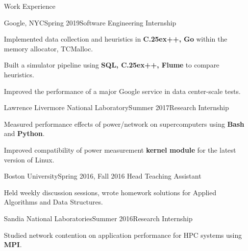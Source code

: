 \documentclass{resume}
\def\bfCplusplus{{\rm{\bf C\raise.25ex\hbox{\small ++}}}}
\begin{document}
\begin{rSection}{Work Experience}

\begin{rWorksection}{Google, NYC}{Spring 2019}{Software Engineering
    Internship}
\item Implemented data collection and heuristics in {\bf \bfCplusplus{}, Go} within the memory
  allocator, TCMalloc.
\item Built a simulator pipeline using {\bf SQL, \bfCplusplus{}, Flume} to
  compare heuristics.
\item Improved the performance of a major Google service in data center-scale tests.
\end{rWorksection}

\begin{rWorksection}{Lawrence Livermore National Laboratory}{Summer
    2017}{Research Internship}
\item Measured performance effects of power/network on supercomputers using {\bf
    Bash} and {\bf Python}.
\item Improved compatibility of power measurement {\bf kernel module} for the
  latest version of Linux.
\end{rWorksection}

\begin{rWorksection}{Boston University}{Spring 2016, Fall 2016}
    {Head Teaching Assistant}
\item Held weekly discussion sessions, wrote homework solutions for Applied
  Algorithms and Data Structures.
\end{rWorksection}

\begin{rWorksection}{Sandia National Laboratories}{Summer 2016}{Research
    Internship}
\item Studied network contention on application performance for HPC systems
  using {\bf MPI}.
\end{rWorksection}

\end{rSection}
\end{document}
